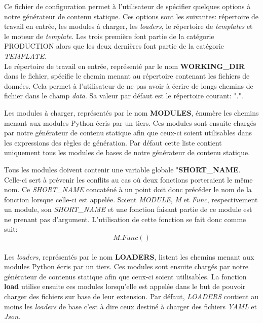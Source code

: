 		Ce fichier de configuration permet à l'utilisateur de spécifier quelques options à notre générateur de contenu statique. Ces options sont les suivantes: répertoire de travail en entrée, les modules à charger, les \textit{loaders}, le répertoire de \textit{templates} et le moteur de \textit{template}. Les trois première font partie de la catégorie PRODUCTION alors que les deux dernières font partie de la catégorie \textit{TEMPLATE}.\\
		
		Le répertoire de travail en entrée, représenté par le nom \textbf{WORKING\_DIR} dans le fichier, spécifie le chemin menant au répertoire contenant les fichiers de données. Cela permet à l'utilisateur de ne pas avoir à écrire de longs chemins de fichier dans le champ \textit{data}. Sa valeur par défaut est le répertoire courant: ".".
		
		Les modules à charger, représentés par le nom \textbf{MODULES}, énumère les chemins menant aux modules Python écris par un tiers. Ces modules sont ensuite chargés par notre générateur de contenu statique afin que ceux-ci soient utilisables dans les expressions des règles de génération. Par défaut cette liste contient uniquement tous les modules de bases de notre générateur de contenu statique.
		
		Tous les modules doivent contenir une variable globale "\textbf{SHORT\_NAME}. Celle-ci sert à prévenir les conflits au cas où deux fonctions porteraient le même nom. Ce \textit{SHORT\_NAME} concaténé à un point doit donc précéder le nom de la fonction lorsque celle-ci est appelée. Soient \textit{MODULE}, \textit{M} et \textit{Func}, respectivement un module, son \textit{SHORT\_NAME} et une fonction faisant partie de ce module est ne prenant pas d'argument. L'utilisation de cette fonction se fait donc comme suit:
		\[
			M.Func()
		\] \\
		
		Les \textit{loaders}, représentés par le nom \textbf{LOADERS}, listent les chemins menant aux modules Python écris par un tiers. Ces modules sont ensuite chargés par notre générateur de contenus statique afin que ceux-ci soient utilisables. La fonction \textbf{load} utilise ensuite ces modules lorsqu'elle est appelée dans le but de pouvoir charger des fichiers sur base de leur extension. Par défaut, \textit{LOADERS} contient au moins les \textit{loaders} de base c'est à dire ceux destiné à charger des fichiers \textit{YAML} et \textit{Json}.\\
		
